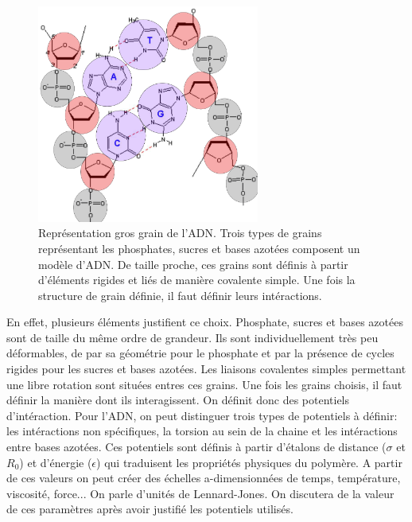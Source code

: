 \begin{figure}[H]
\begin{center}
\includegraphics[width=0.65\textwidth]{coarsegraining.png}

\caption[Modèle gros grains]{Représentation gros grain de l'ADN. Trois types de grains représentant les phosphates, sucres et bases azotées composent un modèle d'ADN. De taille proche, ces grains sont définis à partir d'éléments rigides et liés de manière covalente simple. Une fois la structure de grain définie, il faut définir leurs intéractions.}
\label{coarsegraindna}
\end{center}
\end{figure}


En effet, plusieurs éléments justifient ce choix. Phosphate, sucres et bases azotées sont de taille du même ordre de grandeur. Ils sont individuellement très peu déformables, de par sa géométrie pour le phosphate et par la présence de cycles rigides pour les sucres et bases azotées. Les liaisons covalentes simples permettant une libre rotation sont situées entres ces grains. Une fois les grains choisis, il faut définir la manière dont ils interagissent. On définit donc des potentiels d'intéraction. Pour l'ADN, on peut distinguer trois types de potentiels à définir: les intéractions non spécifiques, la torsion au sein de la chaine et les intéractions entre bases azotées. Ces potentiels sont définis à partir d'étalons de distance ($\sigma$ et $R_0$) et d'énergie ($\epsilon$) qui traduisent les propriétés physiques du polymère. A partir de ces valeurs on peut créer des échelles a-dimensionnées de temps, température, viscosité, force... On parle d'unités de Lennard-Jones. On discutera de la valeur de ces paramètres après avoir justifié les potentiels utilisés.


